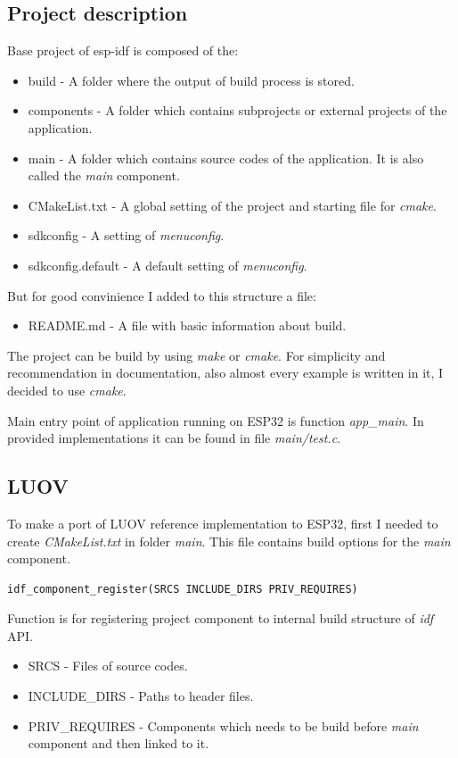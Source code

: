 \documentclass[thesis=M,english]{FITthesis}[2019/12/23]
\begin{document}
\subsection{Project description}
Base project of esp-idf is composed of the:
\begin{itemize}
\item	build - A folder where the output of build process is stored.
\item	components - A folder which contains subprojects or external projects of the application.
\item	main - A folder which contains source codes of the application. It is also called the \textit{main} component. 
\item	CMakeList.txt - A global setting of the project and starting file for \textit{cmake}. 
\item	sdkconfig - A setting of \textit{menuconfig}.
\item	sdkconfig.default - A default setting of \textit{menuconfig}.
\end{itemize}
But for good convinience I added to this structure a file:
\begin{itemize}
\item	README.md - A file with basic information about build.
\end{itemize}

\noindent
The project can be build by using \textit{make} or \textit{cmake}. For simplicity and recommendation in documentation, also almost every example is written in it, I decided to use \textit{cmake}.

\bigskip
\noindent
Main entry point of application running on ESP32 is function \textit{app\_main}. In provided implementations it can be found in file \textit{main/test.c}.

\subsection{LUOV}
To make a port of LUOV reference implementation to ESP32, first I needed to create \textit{CMakeList.txt} in folder \textit{main}. This file contains build options for the \textit{main} component.
\begin{lstlisting}[frame=single]
idf_component_register(SRCS INCLUDE_DIRS PRIV_REQUIRES)
\end{lstlisting}
Function is for registering project component to internal build structure of \textit{idf} API.
\begin{itemize}
\item	SRCS  - Files of source codes.
\item	INCLUDE\_DIRS - Paths to header files.
\item	 PRIV\_REQUIRES - Components which needs to be build before \textit{main} component and then linked to it.
\end{itemize}
\end{document}
